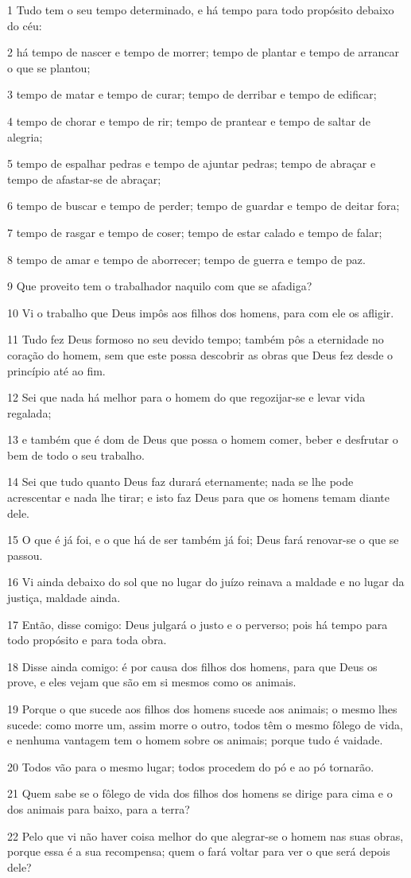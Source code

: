 \par 1 Tudo tem o seu tempo determinado, e há tempo para todo propósito debaixo do céu:
\par 2 há tempo de nascer e tempo de morrer; tempo de plantar e tempo de arrancar o que se plantou;
\par 3 tempo de matar e tempo de curar; tempo de derribar e tempo de edificar;
\par 4 tempo de chorar e tempo de rir; tempo de prantear e tempo de saltar de alegria;
\par 5 tempo de espalhar pedras e tempo de ajuntar pedras; tempo de abraçar e tempo de afastar-se de abraçar;
\par 6 tempo de buscar e tempo de perder; tempo de guardar e tempo de deitar fora;
\par 7 tempo de rasgar e tempo de coser; tempo de estar calado e tempo de falar;
\par 8 tempo de amar e tempo de aborrecer; tempo de guerra e tempo de paz.
\par 9 Que proveito tem o trabalhador naquilo com que se afadiga?
\par 10 Vi o trabalho que Deus impôs aos filhos dos homens, para com ele os afligir.
\par 11 Tudo fez Deus formoso no seu devido tempo; também pôs a eternidade no coração do homem, sem que este possa descobrir as obras que Deus fez desde o princípio até ao fim.
\par 12 Sei que nada há melhor para o homem do que regozijar-se e levar vida regalada;
\par 13 e também que é dom de Deus que possa o homem comer, beber e desfrutar o bem de todo o seu trabalho.
\par 14 Sei que tudo quanto Deus faz durará eternamente; nada se lhe pode acrescentar e nada lhe tirar; e isto faz Deus para que os homens temam diante dele.
\par 15 O que é já foi, e o que há de ser também já foi; Deus fará renovar-se o que se passou.
\par 16 Vi ainda debaixo do sol que no lugar do juízo reinava a maldade e no lugar da justiça, maldade ainda.
\par 17 Então, disse comigo: Deus julgará o justo e o perverso; pois há tempo para todo propósito e para toda obra.
\par 18 Disse ainda comigo: é por causa dos filhos dos homens, para que Deus os prove, e eles vejam que são em si mesmos como os animais.
\par 19 Porque o que sucede aos filhos dos homens sucede aos animais; o mesmo lhes sucede: como morre um, assim morre o outro, todos têm o mesmo fôlego de vida, e nenhuma vantagem tem o homem sobre os animais; porque tudo é vaidade.
\par 20 Todos vão para o mesmo lugar; todos procedem do pó e ao pó tornarão.
\par 21 Quem sabe se o fôlego de vida dos filhos dos homens se dirige para cima e o dos animais para baixo, para a terra?
\par 22 Pelo que vi não haver coisa melhor do que alegrar-se o homem nas suas obras, porque essa é a sua recompensa; quem o fará voltar para ver o que será depois dele?

